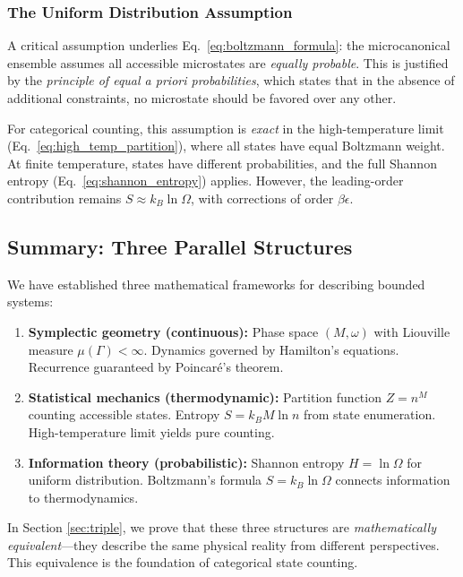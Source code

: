 \documentclass[twocolumn,10pt]{article}
\theoremstyle{remark}
\begin{document}
\subsubsection{The Uniform Distribution Assumption}

A critical assumption underlies Eq.~\eqref{eq:boltzmann_formula}: the microcanonical ensemble assumes all accessible microstates are \textit{equally probable}. This is justified by the \textit{principle of equal a priori probabilities}, which states that in the absence of additional constraints, no microstate should be favored over any other.

For categorical counting, this assumption is \textit{exact} in the high-temperature limit (Eq.~\eqref{eq:high_temp_partition}), where all states have equal Boltzmann weight. At finite temperature, states have different probabilities, and the full Shannon entropy (Eq.~\eqref{eq:shannon_entropy}) applies. However, the leading-order contribution remains $S \approx k_B \ln \Omega$, with corrections of order $\beta \epsilon$.

\subsection{Summary: Three Parallel Structures}

We have established three mathematical frameworks for describing bounded systems:

\begin{enumerate}
    \item \textbf{Symplectic geometry (continuous):} Phase space $(M, \omega)$ with Liouville measure $\mu(\Gamma) < \infty$. Dynamics governed by Hamilton's equations. Recurrence guaranteed by Poincaré's theorem.

    \item \textbf{Statistical mechanics (thermodynamic):} Partition function $Z = n^M$ counting accessible states. Entropy $S = k_B M \ln n$ from state enumeration. High-temperature limit yields pure counting.

    \item \textbf{Information theory (probabilistic):} Shannon entropy $H = \ln \Omega$ for uniform distribution. Boltzmann's formula $S = k_B \ln \Omega$ connects information to thermodynamics.
\end{enumerate}

In Section \ref{sec:triple}, we prove that these three structures are \textit{mathematically equivalent}—they describe the same physical reality from different perspectives. This equivalence is the foundation of categorical state counting.
\end{document}
